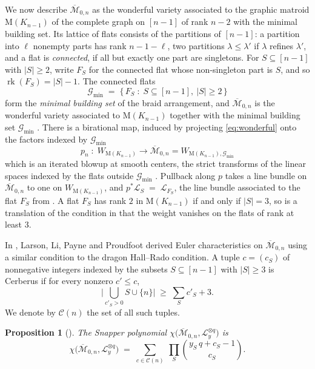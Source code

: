 \documentclass[11pt,a4paper,reqno]{amsart}
\theoremstyle{results}
\newtheorem{proposition}[thm]{Proposition}
\theoremstyle{definitions}
\newcommand{\G}{\textrm{G}}
\newcommand{\rk}{\operatorname{rk}}
\newcommand{\M}{\mathrm{M}}
\renewcommand{\G}{\mathcal{G}}
\newcommand{\cL}{\mathcal{L}}
\newcommand{\Cer}{\mathcal{C}}
\newcommand{\Mbar}{\overline{\mathcal M}}
\begin{document}
We now describe $\Mbar_{0, n}$ as the wonderful variety associated to the graphic matroid $\M(K_{n-1})$ of
the complete graph on $[n-1]$ of rank $n-2$ with the minimal building set. Its lattice of flats consists of the partitions of
$[n-1]$: a partition into $\ell$ nonempty parts has rank $n-1-\ell$, two partitions $\lambda \leqslant \lambda'$ if $\lambda$ refines $\lambda'$, and a flat is
\emph{connected}, if all but exactly one part are singletons. For
$S \subseteq [n-1]$ with $|S| \geqslant 2$, write $F_S$ for the connected flat whose
non-singleton part is $S$, and so $\rk(F_S) = |S| - 1$.  The
connected flats
\[
  \G_{\min} \;=\; \big\{\, F_S \;:\; S \subseteq [n-1],\ |S| \geqslant 2 \,\big\}
\]
form the \emph{minimal building set} of the braid arrangement, and $\Mbar_{0,n}$ is the
wonderful variety associated to $\M(K_{n-1})$ together with the minimal building
set $\G_{\min}$ \cite{feichtner2004chow, kapranov1993chow}.
There is a birational map, induced by projecting \eqref{eq:wonderful} onto the factors indexed by $\G_{\min}$
\[
  p_n \; \colon \; W_{\M(K_{n-1})} \longrightarrow \Mbar_{0,n} = W_{\M(K_{n-1}), \G_{\min}}
\]
which is an iterated blowup at smooth centers, the strict transforms of the
linear spaces indexed by the flats outside $\G_{\min}$ \cite[\S 4]{larson2024k}.
Pullback along $p$ takes a line bundle on $\Mbar_{0,n}$ to one on
$W_{\M(K_{n-1})}$, and $p^{*}\cL_S \;=\; \cL_{F_S}$,
the line bundle associated to the flat $F_S$ from .
A flat $F_S$ has rank $2$ in $\M(K_{n-1})$ if and only if $|S| = 3$, so
 is a translation of the condition in  that the
weight vanishes on the flats of rank at least $3$.

In \cite[\S 9]{larson2024k}, Larson, Li, Payne and Proudfoot derived Euler characteristics on $\Mbar_{0,n}$ using a similar condition to the dragon Hall--Rado condition.
A tuple $c = (c_S)$ of
nonnegative integers indexed by the subsets $S \subseteq [n-1]$ with
$|S| \geqslant 3$ is Cerberus if
for every nonzero $c' \leqslant c$,
\begin{equation}\label{eq:cerberus-body}
  \tag{Cerberus}
  \Big|\bigcup_{c'_S > 0} S \cup \{n\}\Big| \;\geqslant\; \sum_S c'_S + 3.
\end{equation}
We denote by $\Cer(n)$ the set of all such tuples.

\begin{proposition}[{\cite[Theorem 9.1]{larson2024k}}]
  \label{prop:LLPP-cerberus}
The Snapper polynomial $\chi\big(\Mbar_{0,n}, \cL_y^{\otimes q}\big)$ is
\begin{equation}\label{eq:cerberus}
  \chi\big(\Mbar_{0,n}, \cL_y^{\otimes q}\big) \;=\; \sum_{c \in \Cer(n)} \ \prod_{S} \binom{y_S\, q + c_S - 1}{c_S}.
\end{equation}
\end{proposition}
\end{document}
